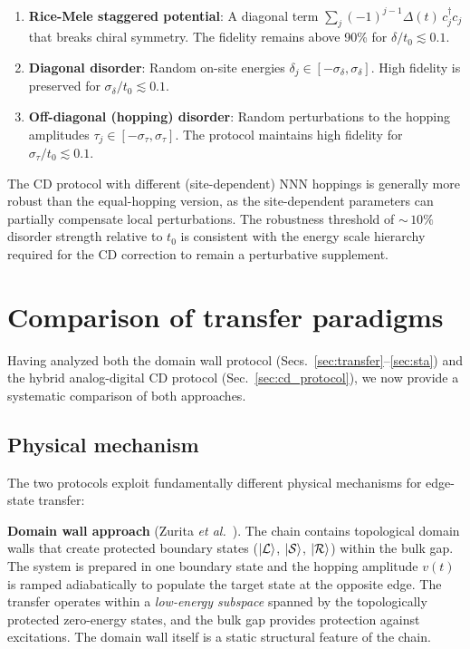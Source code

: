 \documentclass[
  reprint,
  amsmath,
  amssymb,
  aps,
  prb,
  longbibliography,
]{revtex4-2}
\newcommand{\ketL}{\ket{\mathcal{L}}}
\newcommand{\ketS}{\ket{\mathcal{S}}}
\newcommand{\ketR}{\ket{\mathcal{R}}}
\begin{document}
\begin{enumerate}
  \item \textbf{Rice-Mele staggered potential}: A diagonal term
    $\sum_j (-1)^{j-1}\Delta(t)\, c_j^\dagger c_j$ that breaks chiral
    symmetry. The fidelity remains above 90\% for $\delta/t_0 \lesssim 0.1$.
  \item \textbf{Diagonal disorder}: Random on-site energies
    $\delta_j \in [-\sigma_\delta, \sigma_\delta]$. High fidelity is
    preserved for $\sigma_\delta/t_0 \lesssim 0.1$.
  \item \textbf{Off-diagonal (hopping) disorder}: Random perturbations to
    the hopping amplitudes $\tau_j \in [-\sigma_\tau, \sigma_\tau]$.
    The protocol maintains high fidelity for $\sigma_\tau/t_0 \lesssim 0.1$.
\end{enumerate}

The CD protocol with different (site-dependent) NNN hoppings is generally
more robust than the equal-hopping version, as the site-dependent parameters
can partially compensate local perturbations. The robustness threshold of
${\sim}\,10\%$ disorder strength relative to $t_0$ is consistent with the
energy scale hierarchy required for the CD correction to remain a perturbative
supplement.

\section{Comparison of transfer paradigms}
\label{sec:comparison}

Having analyzed both the domain wall protocol
(Secs.~\ref{sec:transfer}--\ref{sec:sta}) and the hybrid analog-digital
CD protocol (Sec.~\ref{sec:cd_protocol}), we now provide a systematic
comparison of both approaches.

\subsection{Physical mechanism}
\label{sec:comp_mechanism}

The two protocols exploit fundamentally different physical mechanisms for
edge-state transfer:

\textbf{Domain wall approach} (Zurita \textit{et al.}~\cite{Zurita2023}).
The chain contains topological domain walls that create protected boundary
states ($\ketL$, $\ketS$, $\ketR$) within the bulk gap. The system is
prepared in one boundary state and the hopping amplitude $v(t)$ is ramped
adiabatically to populate the target state at the opposite edge.
The transfer operates within a \emph{low-energy subspace} spanned by the
topologically protected zero-energy states, and the bulk gap provides
protection against excitations. The domain wall itself is a static
structural feature of the chain.
\end{document}
